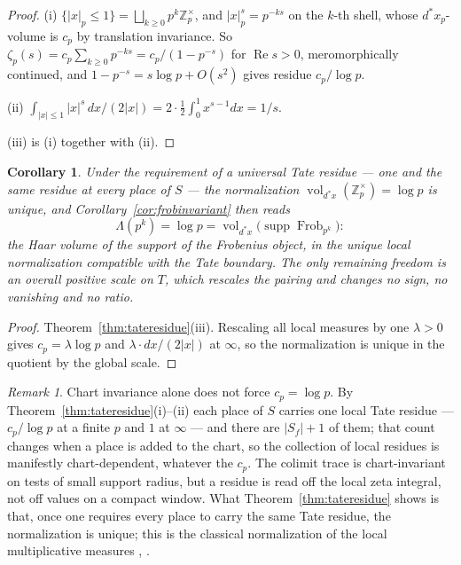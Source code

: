 \documentclass[11pt]{amsart}
\newtheorem{corollary}[theorem]{Corollary}
\theoremstyle{definition}
\theoremstyle{remark}
\newtheorem{remark}[theorem]{Remark}
\newcommand{\Z}{\mathbb Z}
\newcommand{\Rel}{\operatorname{Re}}
\newcommand{\Frob}{\operatorname{Frob}}
\newcommand{\supp}{\operatorname{supp}}
\newcommand{\vol}{\operatorname{vol}}
\begin{document}
\begin{proof}
(i) $\{|x|_p\le1\}=\bigsqcup_{k\ge0}p^k\Z_p^\times$, and $|x|_p^s=p^{-ks}$ on
the $k$-th shell, whose $d^*x_p$-volume is $c_p$ by translation invariance. So
$\zeta_p(s)=c_p\sum_{k\ge0}p^{-ks}=c_p/(1-p^{-s})$ for $\Rel s>0$,
meromorphically continued, and $1-p^{-s}=s\log p+O(s^2)$ gives residue
$c_p/\log p$.

(ii) $\int_{|x|\le1}|x|^s\,dx/(2|x|)=2\cdot\tfrac12\int_0^1x^{s-1}dx=1/s$.

(iii) is (i) together with (ii).
\end{proof}

\begin{corollary}\label{cor:uniquenorm}
Under the requirement of a \emph{universal Tate residue} --- one and the same
residue at every place of $S$ --- the normalization
$\vol_{d^*x}(\Z_p^\times)=\log p$ is unique, and
Corollary~\ref{cor:frobinvariant} then reads
\[
  \Lambda(p^k)=\log p=\vol_{d^*x}\bigl(\supp\Frob_{p^k}\bigr):
\]
the Haar volume of the support of the Frobenius object, in the unique local
normalization compatible with the Tate boundary. The only remaining freedom is
an overall positive scale on $T$, which rescales the pairing and changes no
sign, no vanishing and no ratio.
\end{corollary}

\begin{proof}
Theorem~\ref{thm:tateresidue}(iii). Rescaling all local measures by one
$\lambda>0$ gives $c_p=\lambda\log p$ and $\lambda\cdot dx/(2|x|)$ at $\infty$,
so the normalization is unique in the quotient by the global scale.
\end{proof}

\begin{remark}\label{rem:notchartinv}
Chart invariance alone does not force $c_p=\log p$. By Theorem~\ref{thm:tateresidue}(i)--(ii) each place
of $S$ carries one local Tate residue --- $c_p/\log p$ at a finite $p$ and $1$
at $\infty$ --- and there are $|S_f|+1$ of them; that count changes when a
place is added to the chart, so the collection of local residues is manifestly
chart-dependent, whatever the $c_p$. The colimit trace is chart-invariant on
tests of small support radius, but a residue is read off the local zeta
integral, not off values on a compact window.  What Theorem~\ref{thm:tateresidue}
shows is that, once one requires every place to carry the same Tate residue,
the normalization is unique; this is the classical normalization of the local
multiplicative measures \cite{Weil1952}, \cite{Tate}.
\end{remark}
\end{document}
